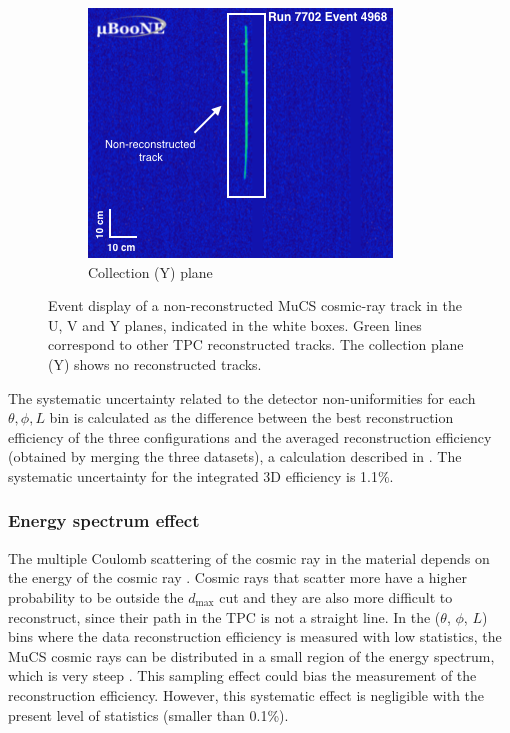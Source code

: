 \documentclass[a4paper,11pt]{article}
\begin{document}
\begin{figure}[htbp]
\begin{center}
    \begin{subfigure}{0.3\textwidth}
      \includegraphics[width=\linewidth]{figures/y.png}
      \caption{Collection (Y) plane} \label{fig:y}
    \end{subfigure}    \caption{Event display of a non-reconstructed MuCS cosmic-ray track in the U, V and Y planes, indicated in the white boxes. Green lines correspond to other TPC reconstructed tracks. The collection plane (Y) shows no reconstructed tracks.} \label{fig:example}
  \end{center}
\end{figure}

The systematic uncertainty related to the detector non-uniformities for each $\theta,\phi,L$ bin is calculated as the difference between the best reconstruction efficiency of the three configurations and the averaged reconstruction efficiency (obtained by merging the three datasets), a calculation described in \cite{besiii}. The systematic uncertainty for the integrated 3D efficiency is 1.1\%.

\subsubsection{Energy spectrum effect}
The multiple Coulomb scattering of the cosmic ray in the material depends on the energy of the cosmic ray \cite{pdg}. Cosmic rays that scatter more have a higher probability to be outside the $d_{\mathrm{max}}$ cut and they are also more difficult to reconstruct, since their path in the TPC is not a straight line. In the ($\theta$, $\phi$, $L$) bins where the data reconstruction efficiency is measured with low statistics, the MuCS cosmic rays can be distributed in a small region of the energy spectrum, which is very steep \cite{corsika}. This sampling effect could bias the measurement of the reconstruction efficiency. However, this systematic effect is negligible with the present level of statistics (smaller than 0.1\%).
\end{document}
